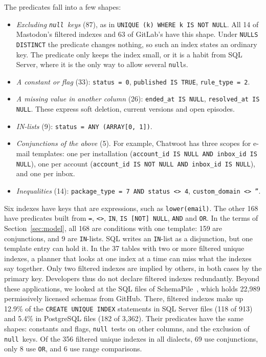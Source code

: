 \documentclass[conference]{IEEEtran}
\theoremstyle{definition}
\newcommand{\sql}[1]{\texttt{#1}}
\newcommand{\nul}{\texttt{null}}
\newif\ifextended
\begin{document}
The predicates fall into a few shapes:
\begin{itemize}
\item \emph{Excluding \nul\ keys} (87), as in \sql{UNIQUE (k) WHERE k IS NOT NULL}. All 14 of Mastodon's filtered
  indexes and 63 of GitLab's have this shape. Under \sql{NULLS DISTINCT} the predicate changes nothing, so such an
  index states an ordinary key. The predicate only keeps the index small, or it is a habit from SQL Server, where it is
  the only way to allow several \nul s.
\item \emph{A constant or flag} (33): \sql{status = 0}, \sql{published IS TRUE}, \sql{rule\_type = 2}.
\item \emph{A missing value in another column} (26): \sql{ended\_at IS NULL}, \sql{resolved\_at IS NULL}. These express
  soft deletion, current versions and open episodes.
\item \emph{IN-lists} (9): \sql{status = ANY (ARRAY[0, 1])}.
\item \emph{Conjunctions of the above} (5). For example, Chatwoot has three scopes for e-mail templates: one per
  installation (\sql{account\_id IS NULL AND inbox\_id IS NULL}), one per account (\sql{account\_id IS NOT NULL AND
  inbox\_id IS NULL}), and one per inbox.
\item \emph{Inequalities} (14): \sql{package\_type = 7 AND status <> 4}, \sql{custom\_domain <> ''}.
\end{itemize}
Six indexes have keys that are expressions, such as \sql{lower(email)}. The other 168 have predicates built from
\sql{=}, \sql{<>}, \sql{IN}, \sql{IS [NOT] NULL}, \sql{AND} and \sql{OR}. In the terms of Section~\ref{sec:model}, all
168 are conditions with one template: 159 are conjunctions, and 9 are \sql{IN}-lists. SQL writes an \sql{IN}-list as a
disjunction, but one template entry can hold it. In the 37 tables with two or more filtered unique indexes, a planner that
looks at one index at a time can miss what the indexes say together. Only two filtered indexes are
implied by others, in both cases by the primary key. Developers thus do not declare filtered indexes redundantly.
\ifextended
Beyond these applications, we looked at the SQL files of SchemaPile~\cite{SchemaPile}, which holds 22{,}989
permissively licensed schemas from GitHub. There, filtered indexes make up 12.9\% of the \sql{CREATE UNIQUE INDEX}
statements in SQL Server files (118 of 913) and 5.4\% in PostgreSQL files (182 of 3{,}362). Their predicates have the
same shapes: constants and flags, \nul\ tests on other columns, and the exclusion of \nul\ keys. Of the 356 filtered
unique indexes in all dialects, 69 use conjunctions, only 8 use \sql{OR}, and 6 use range comparisons.
\end{document}
